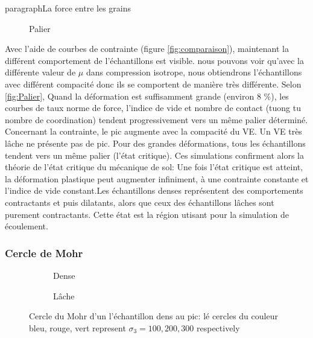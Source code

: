 \documentclass[a4paper,12pt]{report}
\begin{document}
paragraph{La force entre les grains}
\begin{figure}[h!]
    \centering
  \caption{Palier}
    \label{fig:Palier}
\end{figure}
Avec l'aide de courbes de contrainte (figure \ref{fig:comparaison}), maintenant la différent comportement de l'échantillons est visible.
nous pouvons voir qu’avec la différente valeur de $\mu$ dans compression isotrope, nous obtiendrons l’échantillons avec différent compacité donc ils se comportent de manière très différente.
Selon \autoref{fig:Palier}, Quand la déformation est suffisamment grande (environ 8 $\%$), les courbes de taux norme de force, l'indice de vide et nombre de contact (tuong tu nombre de coordination) tendent progressivement vers un même palier déterminé.
Concernant la contrainte, le pic augmente avec la compacité du VE. Un VE très lâche ne présente pas de pic. Pour des grandes déformations, tous les échantillons tendent vers un même palier (l’état critique).
Ces simulations confirment alors la théorie de l’état critique du mécanique de sol: Une fois l’état critique est atteint, la déformation plastique peut augmenter infiniment, à une contrainte constante et l'indice de vide constant.Les échantillons denses représentent des comportements contractants et puis dilatants, alors que ceux des échantillons lâches sont purement contractants.
Cette état est la région utisant pour la simulation de écoulement.

\subsubsection{Cercle de Mohr}
\begin{figure}[h!]
    \centering
    \begin{subfigure}[b]{0.48\textwidth}
        \centering
        \scalebox{0.6}{\small }
        \caption{Dense}
        \label{fig:palier_a}
    \end{subfigure}
    \hfill
    \begin{subfigure}[b]{0.48\textwidth}
        \centering
        \scalebox{0.7}{\small }
        \caption{Lâche}
        \label{fig:palier_b}
    \end{subfigure}
    \caption{Cercle du Mohr d'un l'échantillon dens au pic: lé cercles du couleur bleu, rouge, vert represent $\sigma_3 = 100, 200, 300$ respectively}
    \label{fig:CercleDuMohr}
\end{figure}
\end{document}
